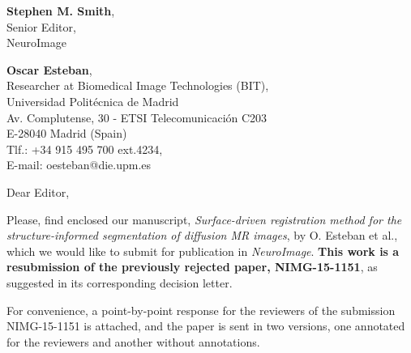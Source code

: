 \documentclass[11pt]{letter} %
\begin{document}

\begin{letter}{\textbf{Stephen M. Smith}, \\
Senior Editor, \\
NeuroImage
}




\begin{flushright}
\textbf{Oscar Esteban}, \\ %
Researcher at Biomedical Image Technologies (BIT), \\
Universidad Polit\'ecnica de Madrid \\
Av. Complutense, 30 - ETSI Telecomunicaci\'on C203 \\
E-28040 Madrid (Spain) \\
Tlf.: +34 915 495 700 ext.4234,\\
E-mail: oesteban@die.upm.es %
\end{flushright}
\vfill

\signature{Oscar Esteban} %


\opening{Dear Editor,}

Please, find enclosed our manuscript, \emph{Surface-driven registration method for the structure-informed segmentation
  of diffusion MR images}, by O. Esteban et al., which we would like to submit for publication in \emph{NeuroImage}.
\textbf{This work is a resubmission of the previously rejected paper, NIMG-15-1151}, as suggested in its
  corresponding decision letter.

For convenience, a point-by-point response for the reviewers of the submission NIMG-15-1151 is attached, and the
  paper is sent in two versions, one annotated for the reviewers and another without annotations.


\end{letter}
\end{document}

